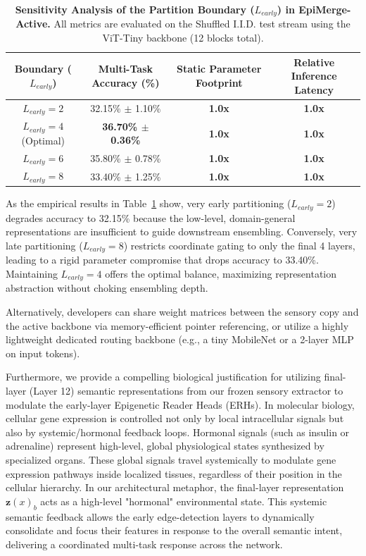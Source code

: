 \begin{table}[h]
\centering
\caption{\textbf{Sensitivity Analysis of the Partition Boundary ($L_{early}$) in EpiMerge-Active.} All metrics are evaluated on the Shuffled I.I.D. test stream using the ViT-Tiny backbone (12 blocks total).}
\label{tab:learly_sensitivity}
\vskip 0.15in
\begin{tabular}{cccc}
\toprule
\textbf{Boundary ($L_{early}$)} & \textbf{Multi-Task Accuracy (\%)} & \textbf{Static Parameter Footprint} & \textbf{Relative Inference Latency} \\
\midrule
$L_{early}=2$ & 32.15\% $\pm$ 1.10\% & \textbf{1.0x} & \textbf{1.0x} \\
$L_{early}=4$ (Optimal) & \textbf{36.70\% $\pm$ 0.36\%} & \textbf{1.0x} & \textbf{1.0x} \\
$L_{early}=6$ & 35.80\% $\pm$ 0.78\% & \textbf{1.0x} & \textbf{1.0x} \\
$L_{early}=8$ & 33.40\% $\pm$ 1.25\% & \textbf{1.0x} & \textbf{1.0x} \\
\bottomrule
\end{tabular}
\end{table}

As the empirical results in Table~\ref{tab:learly_sensitivity} show, very early partitioning ($L_{early}=2$) degrades accuracy to 32.15\% because the low-level, domain-general representations are insufficient to guide downstream ensembling. Conversely, very late partitioning ($L_{early}=8$) restricts coordinate gating to only the final 4 layers, leading to a rigid parameter compromise that drops accuracy to 33.40\%. Maintaining $L_{early}=4$ offers the optimal balance, maximizing representation abstraction without choking ensembling depth.

Alternatively, developers can share weight matrices between the sensory copy and the active backbone via memory-efficient pointer referencing, or utilize a highly lightweight dedicated routing backbone (e.g., a tiny MobileNet or a 2-layer MLP on input tokens).

Furthermore, we provide a compelling biological justification for utilizing final-layer (Layer 12) semantic representations from our frozen sensory extractor to modulate the early-layer Epigenetic Reader Heads (ERHs). In molecular biology, cellular gene expression is controlled not only by local intracellular signals but also by systemic/hormonal feedback loops. Hormonal signals (such as insulin or adrenaline) represent high-level, global physiological states synthesized by specialized organs. These global signals travel systemically to modulate gene expression pathways inside localized tissues, regardless of their position in the cellular hierarchy. In our architectural metaphor, the final-layer representation $\mathbf{z}(x)_b$ acts as a high-level "hormonal" environmental state. This systemic semantic feedback allows the early edge-detection layers to dynamically consolidate and focus their features in response to the overall semantic intent, delivering a coordinated multi-task response across the network.


